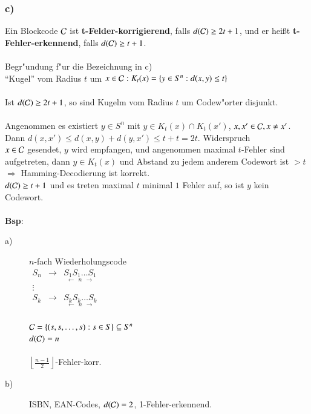 \subsubsection{c)} 
Ein Blockcode $\mathcal{C}$ ist \textbf{t-Felder-korrigierend}, falls $d(\mathcal{C}) \geq 2t+1$, und er hei\ss t \textbf{t-Fehler-erkennend}, falls $d(\mathcal{C}) \geq t+1$. \\
\\
Begr"undung f"ur die Bezeichnung in c) \\
"`Kugel"' vom Radius $t$ um $x \in \mathcal{C}: K_t(x) = \{y \in S^n: d(x,y) \leq t\}$\\
\\
Ist $d(\mathcal{C}) \geq 2t+1$, so sind Kugelm vom Radius $t$ um Codew"orter disjunkt. \\
\\
Angenommen es existiert $y \in S^n$ mit $y \in K_t(x)\cap K_t(x')$, $x,x' \in \mathcal{C}, x \neq x'$. Dann $d(x,x') \leq d(x,y)+d(y,x') \leq t+t = 2t$. Widerspruch\\ %
$x \in \mathcal{C}$ gesendet, $y$ wird empfangen, und angenommen maximal $t$-Fehler sind aufgetreten, dann $y \in K_t(x)$ und Abstand zu jedem anderem Codewort ist $> t$\\
$\Rightarrow$ Hamming-Decodierung ist korrekt.\\
$d(\mathcal{C}) \geq t+1$ und es treten maximal $t$ minimal $1$ Fehler auf, so ist $y$ kein Codewort.\\
\\
\textbf{Bsp}: 
\begin{description}
	\item[a)] $n$-fach Wiederholungscode \\
	$
	\begin{matrix} 
		S_n & \rightarrow & \underset{\longleftarrow \ \ n \ \ \longrightarrow}{S_1 S_1 \ldots S_1} \\ 
		\vdots \\
		S_k & \rightarrow & \underset{\longleftarrow \ \ n \ \ \longrightarrow}{S_k S_k \ldots S_k}
	\end{matrix}$\\
	\\
	$\mathcal{C}=\lbrace (s,s,\ldots,s): s \in S \rbrace \subseteq S^n$ \\
	$d(\mathcal{C})=n$ \\
	\\
	$\left\lfloor \frac{n-1}{2} \right\rfloor$-Fehler-korr.
	\item[b)] ISBN, EAN-Codes, $d(\mathcal{C})=2$, 1-Fehler-erkennend.
\end{description}

